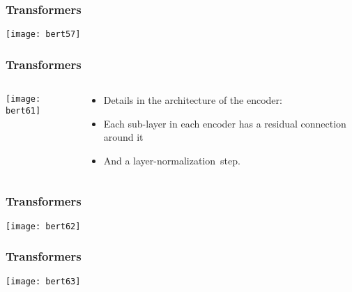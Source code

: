 \begin{frame}[fragile]\frametitle{Transformers}


			\begin{center}
			\texttt{[image: bert57]}
			\end{center}		

			
\end{frame}


\begin{frame}[fragile]\frametitle{Transformers}

\begin{columns}
    \begin{column}[T]{0.5\linewidth}
			\begin{center}
			\texttt{[image: bert61]}
			\end{center}		
		\end{column}
    \begin{column}[T]{0.5\linewidth}
      \begin{itemize}
			\item Details in the architecture of the encoder:
			\item Each sub-layer  in each encoder has a residual connection around it
			\item And a layer-normalization step.
			\end{itemize}
    \end{column}
  \end{columns}
			
\end{frame}

\begin{frame}[fragile]\frametitle{Transformers}


			\begin{center}
			\texttt{[image: bert62]}
			\end{center}		

			
\end{frame}

\begin{frame}[fragile]\frametitle{Transformers}


			\begin{center}
			\texttt{[image: bert63]}
			\end{center}		

			
\end{frame}

